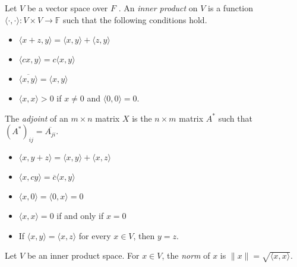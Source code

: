 \documentclass[12pt]{article}
\newenvironment{theorem}[2][Theorem]{\begin{trivlist}
\item[\hskip \labelsep {\bfseries #1}\hskip \labelsep {\bfseries #2.}]}{\end{trivlist}}
\newenvironment{definition}[2][Definition]{\begin{trivlist}
\item[\hskip \labelsep {\bfseries #1}\hskip \labelsep {\bfseries #2}]}{\end{trivlist}}
\begin{document}
\begin{definition}{1}
Let $V$ be a vector space over $F$ . An \textit{inner product} on $V$ is a function $\langle \cdot, \cdot \rangle : V \times V \to \mathbb{F}$ such that the following conditions hold. 
\begin{itemize}
    \item $\langle x + z, y \rangle = \langle x, y \rangle + \langle z,y \rangle$
    
    \item $\langle cx, y \rangle = c\langle x, y \rangle$
    
    \item $\overline{\langle x, y \rangle} = \langle x, y \rangle$
    
    \item $\langle x, x \rangle > 0$ if $x \neq 0$ and $\langle 0, 0 \rangle = 0$.
\end{itemize}
\end{definition}

\begin{definition}{2}
The \textit{adjoint} of an $m \times n$ matrix $X$ is the $n \times m$ matrix $A^*$ such that $(A^*)_{ij} = \overline{A_{ji}}$.
\end{definition}

\begin{theorem}{6.1} \text{ }
\begin{itemize}
    \item $\langle x, y + z \rangle = \langle x, y \rangle + \langle x, z \rangle$
    
    \item $\langle x, cy \rangle = \overline{c}\langle x, y \rangle$
    
    \item $\langle x, 0 \rangle = \langle 0, x \rangle = 0$
    
    \item $\langle x, x \rangle = 0$ if and only if $x = 0$
    
    \item If $\langle x, y \rangle = \langle x, z \rangle$ for every $x \in V$, then $y = z$.
\end{itemize}
\end{theorem}

\begin{definition}{3}
Let $V$ be an inner product space. For $x \in V$, the \textit{norm} of $x$ is $\lVert x \rVert = \sqrt{\langle x, x \rangle}$.
\end{definition}
\end{document}
